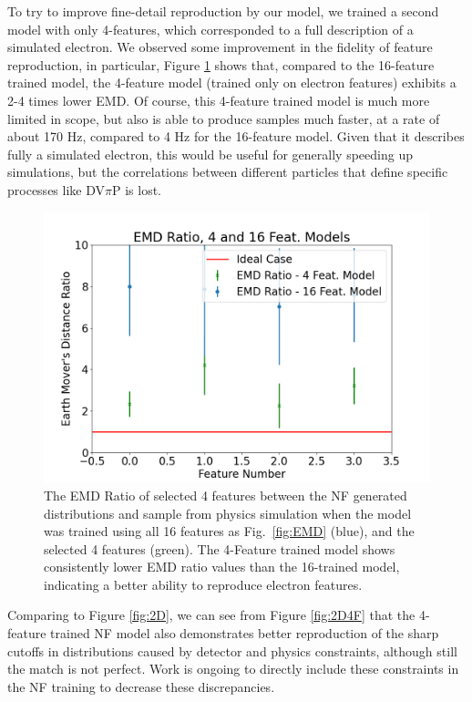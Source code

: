         
        To try to improve fine-detail reproduction by our model, we trained a second model with only 4-features, which corresponded to a full description of a simulated electron. We observed some improvement in the fidelity of feature reproduction, in particular, Figure \ref{fig:EMD2} shows that, compared to the 16-feature trained model, the 4-feature model (trained only on electron features) exhibits a 2-4 times lower EMD. Of course, this 4-feature trained model is much more limited in scope, but also is able to produce samples much faster, at a rate of about 170 Hz, compared to 4 Hz for the 16-feature model. Given that it describes fully a simulated electron, this would be useful for generally speeding up simulations, but the correlations between different particles that define specific processes like DV$\pi$P is lost. 
        
        
        \begin{figure}[H]
            \centering
            \includegraphics[width=.47\textwidth,trim={ 0 0 0 0},clip]{Chapters/Ch3-Simulations/normalizing_flows/pics/FinalPictures/EMD/emdratio416.png}
            \caption[Placeholder Short text]{The EMD Ratio of selected 4 features between the NF generated distributions and sample from physics simulation when the model was trained using all 16 features as Fig.~\ref{fig:EMD} (blue), and the selected 4 features (green). The 4-Feature trained model shows consistently lower EMD ratio values than the 16-trained model, indicating a better ability to reproduce electron features.}
            \label{fig:EMD2}
        \end{figure}
        
        Comparing to Figure \ref{fig:2D}, we can see from Figure \ref{fig:2D4F} that the 4-feature trained NF model also demonstrates better reproduction of the sharp cutoffs in distributions caused by detector and physics constraints, although still the match is not perfect. Work is ongoing to directly include these constraints in the NF training to decrease these discrepancies.
        

